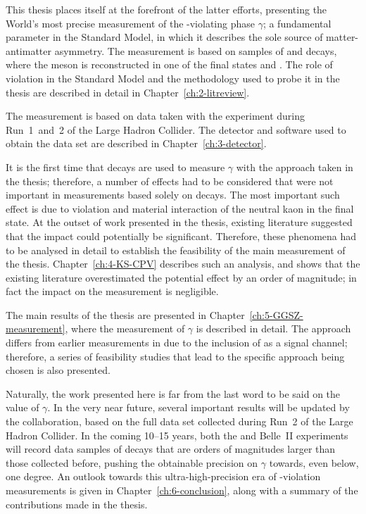 This thesis places itself at the forefront of the latter efforts, presenting the World's most precise measurement of the \CP-violating phase $\gamma$; a fundamental parameter in the Standard Model, in which it describes the sole source of matter-antimatter asymmetry. The measurement is based on samples of \BtoDK and \BtoDpi decays, where the \D meson is reconstructed in one of the final states \Kspipi and \KsKK. The role of \CP violation in the Standard Model and the methodology used to probe it in the thesis are described in detail in Chapter~\ref{ch:2-litreview}.

The measurement is based on data taken with the \lhcb experiment during Run~1~and~2 of the Large Hadron Collider. The detector and software used to obtain the data set are described in Chapter~\ref{ch:3-detector}.

It is the first time that \BtoDpi decays are used to measure $\gamma$ with the approach taken in the thesis; therefore, a number of effects had to be considered that were not important in measurements based solely on \BtoDK decays. The most important such effect is due to \CP violation and material interaction of the neutral kaon in the final state. At the outset of work presented in the thesis, existing literature suggested that the impact could potentially be significant. Therefore, these phenomena had to be analysed in detail to establish the feasibility of the main measurement of the thesis. Chapter~\ref{ch:4-KS-CPV} describes such an analysis, and shows that the existing literature overestimated the potential effect by an order of magnitude; in fact the impact on the measurement is negligible.

The main results of the thesis are presented in Chapter~\ref{ch:5-GGSZ-measurement}, where the measurement of $\gamma$ is described in detail. The approach differs from earlier measurements in \lhcb due to the inclusion of \BtoDpi as a signal channel; therefore, a series of feasibility studies that lead to the specific approach being chosen is also presented.


Naturally, the work presented here is far from the last word to be said on the value of $\gamma$. In the very near future, several important results will be updated by the \lhcb collaboration, based on the full data set collected during Run~2 of the Large Hadron Collider. In the coming 10--15 years, both the \lhcb and Belle~II experiments will record data samples of \B decays that are orders of magnitudes larger than those collected before, pushing the obtainable precision on $\gamma$ towards, even below, one degree. An outlook towards this ultra-high-precision era of \CP-violation measurements is given in Chapter~\ref{ch:6-conclusion}, along with a summary of the contributions made in the thesis.



